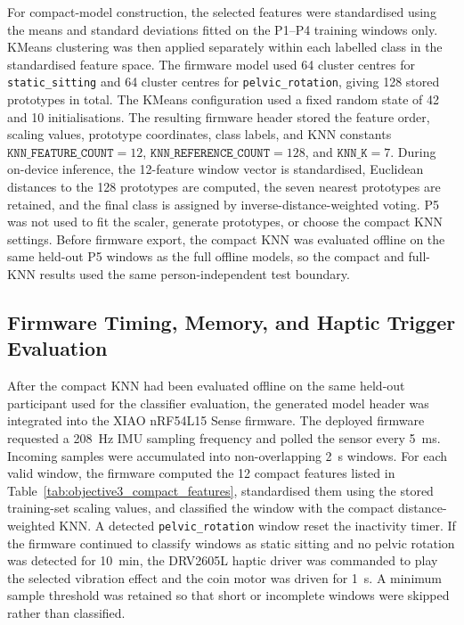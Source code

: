 For compact-model construction, the selected features were standardised using the means and standard deviations fitted on the P1--P4 training windows only. KMeans clustering was then applied separately within each labelled class in the standardised feature space. The firmware model used 64 cluster centres for \texttt{static\_sitting} and 64 cluster centres for \texttt{pelvic\_rotation}, giving 128 stored prototypes in total. The KMeans configuration used a fixed random state of 42 and 10 initialisations. The resulting firmware header stored the feature order, scaling values, prototype coordinates, class labels, and KNN constants \(\texttt{KNN\_FEATURE\_COUNT}=12\), \(\texttt{KNN\_REFERENCE\_COUNT}=128\), and \(\texttt{KNN\_K}=7\). During on-device inference, the 12-feature window vector is standardised, Euclidean distances to the 128 prototypes are computed, the seven nearest prototypes are retained, and the final class is assigned by inverse-distance-weighted voting. P5 was not used to fit the scaler, generate prototypes, or choose the compact KNN settings. Before firmware export, the compact KNN was evaluated offline on the same held-out P5 windows as the full offline models, so the compact and full-KNN results used the same person-independent test boundary.

\subsection{Firmware Timing, Memory, and Haptic Trigger Evaluation}

After the compact KNN had been evaluated offline on the same held-out participant used for the classifier evaluation, the generated model header was integrated into the XIAO nRF54L15 Sense firmware. The deployed firmware requested a 208~Hz IMU sampling frequency and polled the sensor every 5~ms. Incoming samples were accumulated into non-overlapping 2~s windows. For each valid window, the firmware computed the 12 compact features listed in Table~\ref{tab:objective3_compact_features}, standardised them using the stored training-set scaling values, and classified the window with the compact distance-weighted KNN. A detected \texttt{pelvic\_rotation} window reset the inactivity timer. If the firmware continued to classify windows as static sitting and no pelvic rotation was detected for 10~min, the DRV2605L haptic driver was commanded to play the selected vibration effect and the coin motor was driven for 1~s. A minimum sample threshold was retained so that short or incomplete windows were skipped rather than classified.

